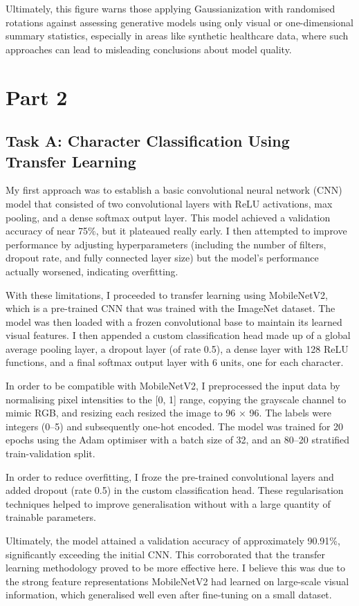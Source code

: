 \documentclass[11pt]{report} %
\begin{document}
Ultimately, this figure warns those applying Gaussianization with randomised rotations against assessing generative models using only visual or one-dimensional summary statistics, especially in areas like synthetic healthcare data, where such approaches can lead to misleading conclusions about model quality.

\chapter{Part 2}
\section{Task A: Character Classification Using Transfer Learning}
My first approach was to establish a basic convolutional neural network (CNN) model that consisted of two convolutional layers with ReLU activations, max pooling, and a dense softmax output layer. This model achieved a validation accuracy of near 75\%, but it plateaued really early. I then attempted to improve performance by adjusting hyperparameters (including the number of filters, dropout rate, and fully connected layer size) but the model’s performance actually worsened, indicating overfitting. 

With these limitations, I proceeded to transfer learning using MobileNetV2, which is a pre-trained CNN that was trained with the ImageNet dataset. The model was then loaded with a frozen convolutional base to maintain its learned visual features. I then appended a custom classification head made up of a global
average pooling layer, a dropout layer (of rate 0.5), a dense layer with 128 ReLU functions, and a final
softmax output layer with 6 units, one for each character.

In order to be compatible with MobileNetV2, I preprocessed the input data by normalising pixel
intensities to the [0, 1] range, copying the grayscale channel to mimic RGB, and resizing each
resized the image to 96 × 96. The labels were integers (0–5) and subsequently one-hot encoded. The model
was trained for 20 epochs using the Adam optimiser with a batch size of 32, and an 80–20 stratified
train-validation split.

In order to reduce overfitting, I froze the pre-trained convolutional layers and added dropout (rate 0.5) in the custom classification head. These regularisation techniques helped to improve generalisation without
with a large quantity of trainable parameters.

Ultimately, the model attained a validation accuracy of approximately 90.91\%, significantly exceeding
the initial CNN. This corroborated that the transfer learning methodology proved to be more effective here.
I believe this was due to the strong feature representations MobileNetV2 had learned on large-scale
visual information, which generalised well even after fine-tuning on a small dataset.
\end{document}
